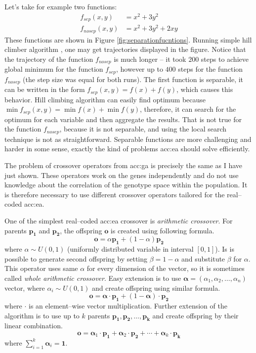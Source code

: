 Let's take for example two functions:
\begin{align*}
    f_{sep}(x,y)&=x^2+3y^2 \\
    f_{nosep}(x,y)&=x^2+3y^2+2xy
\end{align*}
These functions are shown in Figure \ref{fig:separationfucntions}. Running simple hill climber algorithm \citep{HandbookOfMetaheuristics}, one may get trajectories displayed in the figure. Notice that the trajectory of the function $f_{nosep}$ is much longer -- it took $200$ steps to achieve global minimum for the function $f_{sep}$, however up to $400$ steps for the function $f_{nosep}$ (the step size was equal for both runs). The first function is separable, it can be written in the form $f_{sep}(x,y)=f(x)+f(y)$, which causes this behavior. Hill climbing algorithm can easily find optimum because $\min f_{sep}(x,y)=\min f(x)+\min f(y)$, therefore, it can search for the optimum for each variable and then aggregate the results. That is not true for the function $f_{nosep}$, because it is not separable, and using the local search technique is not as straightforward. Separable functions are more challenging and harder in some sense, exactly the kind of problems \acrshort{acc:ea} should solve efficiently.

The problem of crossover operators from \acrshort{acc:ga} is precisely the same as I have just shown. These operators work on the genes independently and do not use knowledge about the correlation of the genotype space within the population. It is therefore necessary to use different crossover operators tailored for the real--coded \acrshort{acc:ea}.

One of the simplest real--coded \acrshort{acc:ea} crossover is \emph{arithmetic crossover}. For parents $\mathbf{p_1}$ and $\mathbf{p_2}$, the offspring $\mathbf{o}$ is created using following formula.
$$
\mathbf{o} = \alpha\mathbf{p_1}+\left(1-\alpha\right)\mathbf{p_2}
$$
where $\alpha \sim U(0,1)$ (uniformly distributed variable in interval $\left[0,1\right]$). Is is possible to generate second offspring by setting $\beta=1-\alpha$ and substitute $\beta$ for $\alpha$. This operator uses same $\alpha$ for every dimension of the vector, so it is sometimes called \emph{whole arithmetic crossover}. Easy extension is to use $\boldsymbol{\alpha}=(\alpha_1,\alpha_2,\dots,\alpha_n)$ vector, where $\alpha_i\sim U(0,1)$ and create offspring using similar formula.
$$
\mathbf{o} = \boldsymbol{\alpha}\cdot\mathbf{p_1}+\left(1-\boldsymbol{\alpha}\right)\cdot\mathbf{p_2}
$$
where $\cdot$ is an element--wise vector multiplication.
Further extension of the algorithm is to use up to $k$ parents $\mathbf{p_1}, \mathbf{p_2},\dots,\mathbf{p_k}$ and create offspring by their linear combination.
$$
\mathbf{o} = 
\boldsymbol{\alpha}_1\cdot\mathbf{p_1}+
\boldsymbol{\alpha}_2\cdot\mathbf{p_2}+
\cdots +
\boldsymbol{\alpha}_k\cdot\mathbf{p_k}
$$
where $\sum_{i=1}^{k}\boldsymbol{\alpha}_i=\boldsymbol{1}$.

